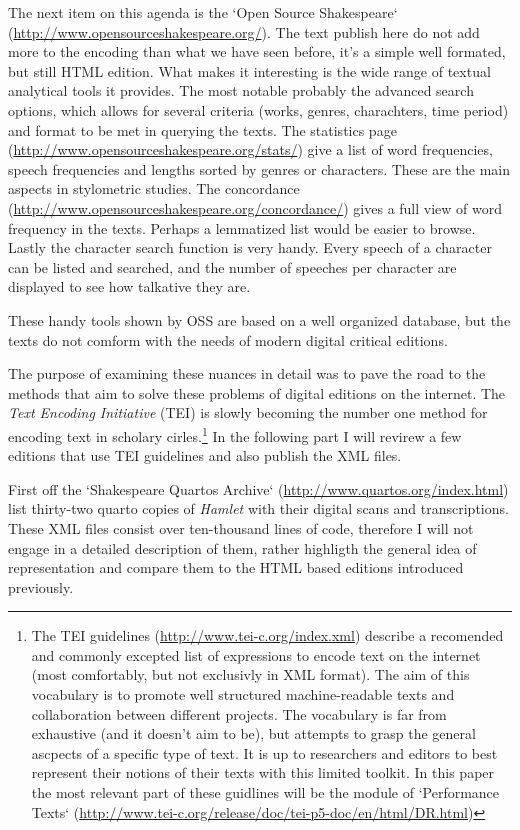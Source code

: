 \documentclass{article}
\begin{document}
The next item on this agenda is the `Open Source Shakespeare` (\url{http://www.opensourceshakespeare.org/}). The text publish here do not add more to the encoding than what we have seen before, it's a simple well formated, but still HTML edition. What makes it interesting is the wide range of textual analytical tools it provides. The most notable probably the advanced search options, which allows for several criteria (works, genres, charachters, time period) and format to be met in querying the texts. The statistics page (\url{http://www.opensourceshakespeare.org/stats/}) give a list of word frequencies, speech frequencies and lengths sorted by genres or characters. These are the main aspects in stylometric studies. The concordance (\url{http://www.opensourceshakespeare.org/concordance/}) gives a full view of word frequency in the texts. Perhaps a lemmatized list would be easier to browse. Lastly the character search function is very handy. Every speech of a character can be listed and searched, and the number of speeches per character are displayed to see how talkative they are.

These handy tools shown by OSS are based on a well organized database, but the texts do not comform with the needs of modern digital critical editions.

The purpose of examining these nuances in detail was to pave the road to the methods that aim to solve these problems of digital editions on the internet. The \textit{Text Encoding Initiative} (TEI) is slowly becoming the number one method for encoding text in scholary cirles.\footnote{The TEI guidelines (\url{http://www.tei-c.org/index.xml}) describe a recomended and commonly excepted list of expressions to encode text on the internet (most comfortably, but not exclusivly in XML format). The aim of this vocabulary is to promote well structured machine-readable texts and collaboration between different projects. The vocabulary is far from exhaustive (and it doesn't aim to be), but attempts to grasp the general ascpects of a specific type of text. It is up to researchers and editors to best represent their notions of their texts with this limited toolkit. In this paper the most relevant part of these guidlines will be the module of `Performance Texts` (\url{http://www.tei-c.org/release/doc/tei-p5-doc/en/html/DR.html})} In the following part I will revirew a few editions that use TEI guidelines and also publish the XML files.

First off the `Shakespeare Quartos Archive` (\url{http://www.quartos.org/index.html}) list thirty-two quarto copies of \textit{Hamlet} with their digital scans and transcriptions. These XML files consist over ten-thousand lines of code, therefore I will not engage in a detailed description of them, rather highligth the general idea of representation and compare them to the HTML based editions introduced previously.
\end{document}
